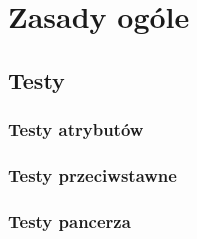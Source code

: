 \chapter{Zasady ogóle}

\section{Testy}
\subsection{Testy atrybutów}
\subsection{Testy przeciwstawne}
\subsection{Testy pancerza}



